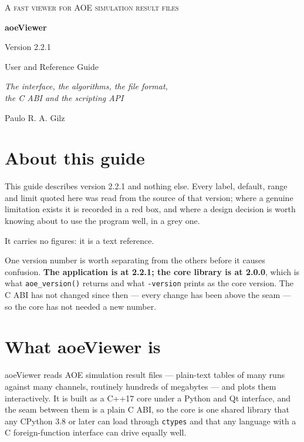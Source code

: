 \documentclass[11pt,a4paper,oneside]{report}
\newcommand{\appver}{2.2.1}
\newcommand{\code}[1]{\texttt{#1}}
\begin{document}
\begin{titlepage}
\centering
\vspace*{3cm}
{\small\scshape\color{aoeaccent} A fast viewer for AOE simulation result files\par}
\vspace{2.2cm}
{\Huge\bfseries aoeViewer\par}
\vspace{0.5cm}
{\Large Version \appver\par}
\vspace{2.4cm}
{\LARGE User and Reference Guide\par}
\vspace{0.6cm}
{\large\itshape The interface, the algorithms, the file format,\\
the C ABI and the scripting API\par}
\vspace{3cm}
{\large Paulo R. A. Gilz\par}
\vfill
\end{titlepage}

\tableofcontents
\clearpage

\chapter*{About this guide}

This guide describes version \appver{} and nothing else. Every label, default,
range and limit quoted here was read from the source of that version; where a
genuine limitation exists it is recorded in a red box, and where a design
decision is worth knowing about to use the program well, in a grey one.

It carries no figures: it is a text reference.

One version number is worth separating from the others before it causes
confusion. \textbf{The application is at \appver; the core library is at
2.0.0}, which is what \code{aoe\_version()} returns and what \code{-version}
prints as the core version. The C ABI has not changed since then --- every
change has been above the seam --- so the core has not needed a new number.

\chapter{What aoeViewer is}

aoeViewer reads AOE simulation result files --- plain-text tables of many runs
against many channels, routinely hundreds of megabytes --- and plots them
interactively. It is built as a C++17 core under a Python and Qt interface, and
the seam between them is a plain C ABI, so the core is one shared library that
any CPython 3.8 or later can load through \code{ctypes} and that any language
with a C foreign-function interface can drive equally well.
\end{document}
